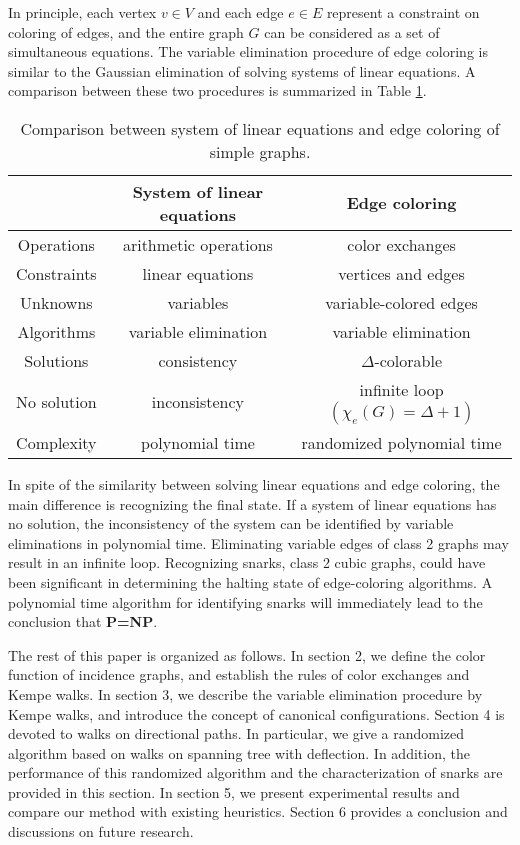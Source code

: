 \documentclass[11pt]{article}
\begin{document}
In principle, each vertex $v\in V$ and each edge $e\in E$ represent a constraint on coloring of edges, and the entire graph $G$ can be considered as a set of simultaneous equations. The variable elimination procedure of edge coloring is similar to the Gaussian elimination of solving systems of linear equations. A comparison between these two procedures is summarized in Table \ref{tab:comp}.
\begin{table}[htpb]
	\centering
	{\footnotesize
		\begin{tabular}{|c || c| c| }
			\hline 
			& System of linear equations & Edge coloring \\
			\hline \hline 
			Operations & arithmetic operations & color exchanges \\ \hline 
			Constraints	& linear equations & vertices and edges \\ \hline 
			Unknowns & variables &  variable-colored edges \\ \hline 
			Algorithms &	variable elimination & variable elimination\\ \hline 
			Solutions	& consistency &	$\Delta$-colorable\\ \hline 
			No solution & inconsistency & infinite loop $(\chi_e(G)=\Delta+1)$\\ \hline 
			Complexity & polynomial time & randomized polynomial time\\ 
			\hline		
		\end{tabular}	
		}
		\caption{Comparison between system of linear equations and edge coloring of simple graphs. }
	\label{tab:comp}
\end{table}

In spite of the similarity between solving linear equations and edge coloring, the main difference is  recognizing the final state. If a system of linear equations has no solution, the inconsistency of the system can be identified by variable eliminations in polynomial time. Eliminating variable edges of class 2 graphs may result in an infinite loop. Recognizing snarks, class 2 cubic graphs, could have been significant in determining the halting state of edge-coloring algorithms. A polynomial time algorithm for identifying snarks will immediately lead to the conclusion that {\bf P=NP}. 

The rest of this paper is organized as follows. In section 2, we define the color function of incidence graphs, and establish the rules of color exchanges and Kempe walks. In section 3, we describe the variable elimination procedure by Kempe walks, and introduce the concept of canonical configurations. Section 4 is devoted to walks on directional paths. In particular, we give a randomized algorithm based on walks on spanning tree with deflection. In addition, the performance of this randomized algorithm and the characterization of snarks are provided in this section. In section 5, we present experimental results and compare our method with existing heuristics. Section 6 provides a conclusion and discussions on future research.
\end{document}
